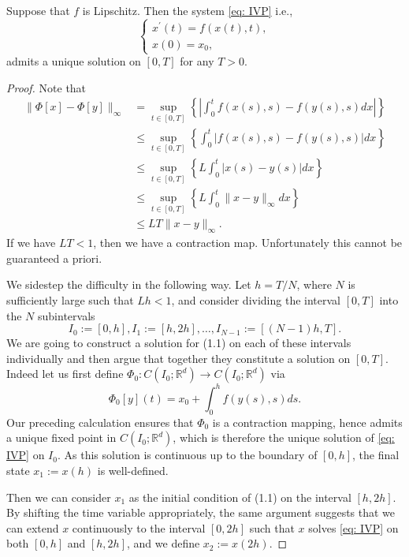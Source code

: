 \begin{theorem}
\label{thm: Picard-Lindelof}
Suppose that $f$ is Lipschitz. Then the system \eqref{eq: IVP} i.e.,
$$
\left\{\begin{array}{l}
x^{\prime}(t)=f(x(t), t), \\
x(0)=x_{0},
\end{array}\right.
$$
admits a unique solution on $[0, T]$ for any $T>0$.
\end{theorem}
\begin{proof}
Note that 
\[
    \begin{aligned}
        \|\Phi[x]-\Phi[y]\|_{\infty} & =\sup _{t \in[0, T]}\left\{\left|\int_0^t f(x(s), s)-f(y(s), s) d x\right|\right\} \\
        & \leq \sup _{t \in[0, T]}\left\{\int_0^t|f(x(s), s)-f(y(s), s)| d x\right\} \\
        & \leq \sup _{t \in[0, T]}\left\{L \int_0^t|x(s)-y(s)| d x\right\} \\
        & \leq \sup _{t \in[0, T]}\left\{L \int_0^t\|x-y\|_{\infty} d x\right\} \\
        & \leq L T\|x-y\|_{\infty} .
        \end{aligned}
\]
If we have $ LT<1 $, then we have a contraction map. Unfortunately this cannot be guaranteed a priori.

We sidestep the difficulty in the following way. Let $h=T / N$, where $N$ is sufficiently large such that $L h<1$, and consider dividing the interval $[0, T]$ into the $N$ subintervals
$$
I_0:=[0, h], I_1:=[h, 2 h], \ldots, I_{N-1}:=[(N-1) h, T] .
$$
We are going to construct a solution for (1.1) on each of these intervals individually and then argue that together they constitute a solution on $[0, T]$.
Indeed let us first define $\Phi_0: C\left(I_0 ; \mathbb{R}^d\right) \rightarrow C\left(I_0 ; \mathbb{R}^d\right)$ via
$$
\Phi_0[y](t)=x_0+\int_0^h f(y(s), s) d s .
$$
Our preceding calculation ensures that $\Phi_0$ is a contraction mapping, hence admits a unique fixed point in $C\left(I_0 ; \mathbb{R}^d\right)$, which is therefore the unique solution of \eqref{eq: IVP} on $I_0$. As this solution is continuous up to the boundary of $[0, h]$, the final state $x_1:=x(h)$ is well-defined.

Then we can consider $x_1$ as the initial condition of (1.1) on the interval $[h, 2 h]$. By shifting the time variable appropriately, the same argument suggests that we can extend $x$ continuously to the interval $[0,2 h]$ such that $x$ solves \eqref{eq: IVP} on both $[0, h]$ and $[h, 2 h]$, and we define $x_2:=x(2 h)$.


\end{proof}
